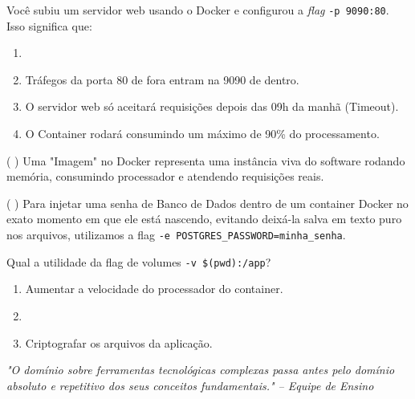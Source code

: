 \documentclass[12pt,a4paper]{article}
\newcommand{\correto}[1]{\iftoggle{gabarito}{\textbf{\color{corGabarito}#1}}{#1}}
\newcommand{\justificativa}[1]{\iftoggle{gabarito}{\vspace{0.2cm}\textbf{\color{corGabarito}Justificativa:} \color{corGabarito}#1}{\vspace{0.8cm}}}
\begin{document}
\begin{tcolorbox}[colback=white, colframe=azulTitulo, title=Questão 27]
    Você subiu um servidor web usando o Docker e configurou a \textit{flag} \texttt{-p 9090:80}. Isso significa que:
    \begin{enumerate}[label=\alph*)]
        \item \correto{Tráfegos que chegam na porta 9090 da sua máquina física serão injetados para dentro da porta 80 do container isolado.}
        \item Tráfegos da porta 80 de fora entram na 9090 de dentro.
        \item O servidor web só aceitará requisições depois das 09h da manhã (Timeout).
        \item O Container rodará consumindo um máximo de 90\% do processamento.
    \end{enumerate}
\end{tcolorbox}

\begin{tcolorbox}[colback=white, colframe=azulTitulo, title=Questão 28 (V/F)]
    ( ) Uma "Imagem" no Docker representa uma instância viva do software rodando memória, consumindo processador e atendendo requisições reais.
    \justificativa{Falso. A "Imagem" é o arquivo empacotado estático. Quem assume vida, gasta memória e atende requisições ativamente é o "Container".}
\end{tcolorbox}

\begin{tcolorbox}[colback=white, colframe=azulTitulo, title=Questão 29 (V/F)]
    ( ) Para injetar uma senha de Banco de Dados dentro de um container Docker no exato momento em que ele está nascendo, evitando deixá-la salva em texto puro nos arquivos, utilizamos a flag \texttt{-e POSTGRES\_PASSWORD=minha\_senha}.
    \justificativa{Verdadeiro. A flag \texttt{-e} passa Variáveis de Ambiente (Environment Variables).}
\end{tcolorbox}

\begin{tcolorbox}[colback=azulTitulo!5, colframe=azulTitulo, title=Questão 30]
    Qual a utilidade da flag de volumes \texttt{-v \$(pwd):/app}?
    \begin{enumerate}[label=\alph*)]
        \item Aumentar a velocidade do processador do container.
        \item \correto{Sincronizar a pasta local com o container (Hot-reload).}
        \item Criptografar os arquivos da aplicação.
    \end{enumerate}
\end{tcolorbox}

\vspace{1cm}
\begin{center}
    \textit{"O domínio sobre ferramentas tecnológicas complexas passa antes pelo domínio absoluto e repetitivo dos seus conceitos fundamentais." -- Equipe de Ensino}
\end{center}
\end{document}
